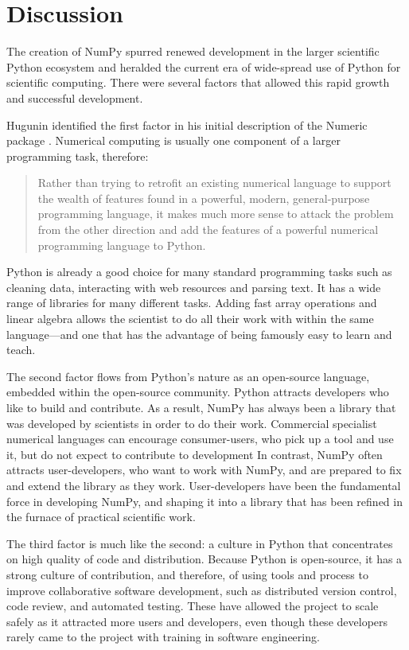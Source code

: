 \section*{Discussion}

The creation of NumPy spurred renewed development in the larger scientific
Python ecosystem and heralded the current era of wide-spread use of Python for
scientific computing.
There were several factors that allowed this rapid growth
and successful development.

Hugunin identified the first factor in his initial description of the Numeric
package \cite{Hugunin-whitepaper}.  Numerical computing is usually one
component of a larger programming task, therefore:

\begin{quote}
    Rather than trying to retrofit an existing numerical language to support
    the wealth of features found in a powerful, modern, general-purpose
    programming language, it makes much more sense to attack the problem from
    the other direction and add the features of a powerful numerical
    programming language to Python.
\end{quote}

Python is already a good choice for many standard programming tasks such as
cleaning data, interacting with web resources and parsing text.  It has a wide
range of libraries for many different tasks. Adding fast array operations and
linear algebra allows the scientist to do all their work with within the same
language---and one that has the advantage of being famously easy to learn and
teach.

The second factor flows from Python's nature as an open-source language,
embedded within the open-source community.  Python attracts developers who like
to build and contribute.  As a result, NumPy has always been a library that was
developed by scientists in order to do their work.  Commercial specialist
numerical languages can encourage consumer-users, who pick up a tool and use
it, but do not expect to contribute to development%
In contrast, NumPy often
attracts user-developers, who want to work with NumPy, and are prepared to fix
and extend the library as they work. User-developers have been the fundamental
force in developing NumPy, and shaping it into a library that has been refined
in the furnace of practical scientific work.

The third factor is much like the second: a culture in Python that concentrates
on high quality of code and distribution. Because Python is open-source, it has
a strong culture of contribution, and therefore, of using tools and process to
improve collaborative software development, such as distributed version
control, code review, and automated testing.  These have allowed the project to
scale safely as it attracted more users and developers, even though these
developers rarely came to the project with training in software engineering.

